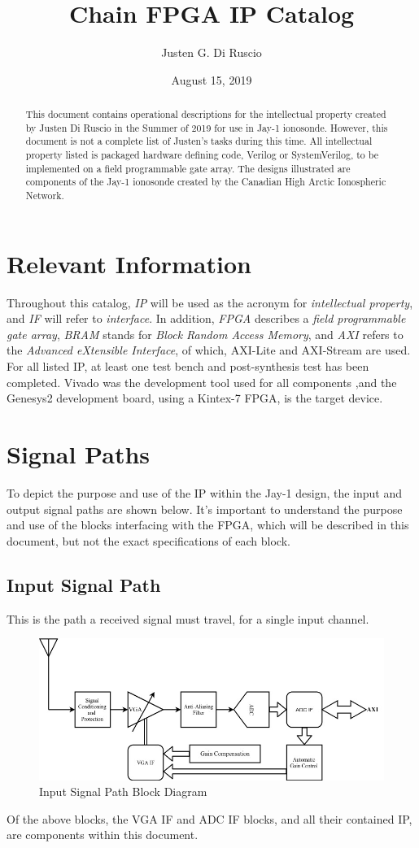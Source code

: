 \documentclass[11pt]{article}
\title{Chain FPGA IP Catalog}
\date{August 15, 2019}
\author{Justen G. Di Ruscio}
\begin{document}
\maketitle
\begin{abstract}
	This document contains operational descriptions for the intellectual property created by Justen Di Ruscio in the Summer of 2019 for use in Jay-1
	ionosonde. However, this document is not a complete list of Justen's tasks during this time. All intellectual property listed is packaged hardware
	defining code, Verilog or SystemVerilog, to be implemented on a field programmable gate array. The designs illustrated are components of the Jay-1 
	ionosonde created by the Canadian High Arctic Ionospheric Network.
\end{abstract}
\section*{Relevant Information}
	Throughout this catalog, \textit{IP} will be used as the acronym for \textit{intellectual property}, and \textit{IF} will refer to 
	\textit{interface}. In addition, \textit{FPGA} describes a \textit{field programmable gate array}, \textit{BRAM} stands for 
	\textit{Block Random Access Memory}, and \textit{AXI} refers to the \textit{Advanced eXtensible Interface}, of which, AXI-Lite and AXI-Stream are 
	used. For all listed IP, at least one test bench and post-synthesis test has been completed. Vivado was the development tool used for all components
	,and the Genesys2 development board, using a Kintex-7 FPGA, is the target device.
\newpage
{}
\tableofcontents
\listoftables
\newpage

\section{Signal Paths}
To depict the purpose and use of the IP within the Jay-1 design, the input and output signal paths are shown below. It's important to understand
the purpose and use of the blocks interfacing with the FPGA, which will be described in this document, but not the exact specifications of each block.
\subsection{Input Signal Path}
This is the path a received signal must travel, for a single input channel.
\begin{figure}[h!]
	\label{inSigPath}
	\centering
	\includegraphics[width=0.8\linewidth]{images/inputSignalDiagram}
	\caption{Input Signal Path Block Diagram}
\end{figure}	
Of the above blocks, the VGA IF and ADC IF blocks, and all their contained IP, are components within this document.
\end{document}
